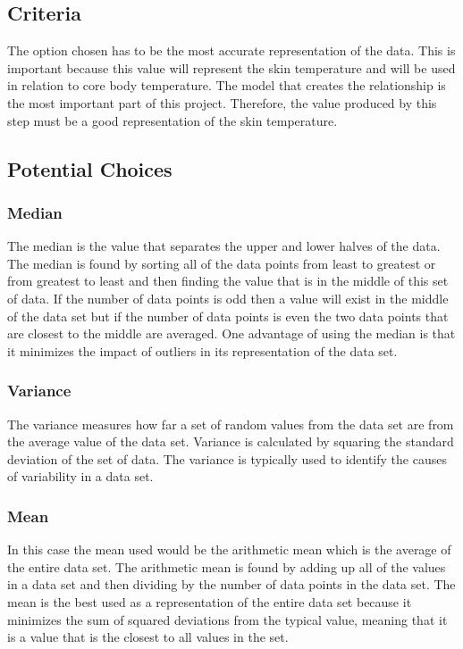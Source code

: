 \documentclass[onecolumn, draftclsnofoot,10pt, compsoc]{IEEEtran}
\begin{document}
		\subsection{Criteria}
		
		The option chosen has to be the most accurate representation of the data. This is important because this value will represent the skin temperature and will be used in relation to core body temperature. The model that creates the relationship is the most important part of this project. Therefore, the value produced by this step must be a good representation of the skin temperature. 
		\subsection{Potential Choices}

		\subsubsection{Median}
		
		The median is the value that separates the upper and lower halves of the data. The median is found by sorting all of the data points from least to greatest or from greatest to least and then finding the value that is in the middle of this set of data. If the number of data points is odd then a value will exist in the middle of the data set but if the number of data points is even the two data points that are closest to the middle are averaged. One advantage of using the median is that it minimizes the impact of outliers in its representation of the data set.\cite{Median}

		\subsubsection{Variance}

        The variance measures how far a set of random values from the data set are from the average value of the data set. Variance is calculated by squaring the standard deviation of the set of data. The variance is typically used to identify the causes of variability in a data set.\cite{Variance}

		\subsubsection{Mean}
		
		In this case the mean used would be the arithmetic mean which is the average of the entire data set. The arithmetic mean is found by adding up all of the values in a data set and then dividing by the number of data points in the data set. The mean is the best used as a representation of the entire data set because it minimizes the sum of squared deviations from the typical value, meaning that it is a value that is the closest to all values in the set. \cite{Mean}
\end{document}

